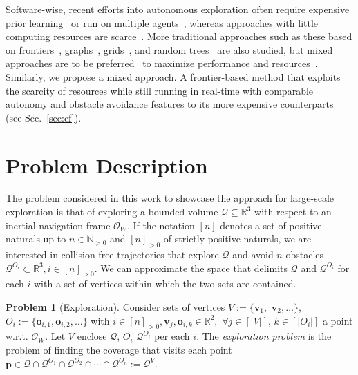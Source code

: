 \documentclass[lettersize,journal]{IEEEtran}
\theoremstyle{definition}
\newtheorem*{pb}{Problem}%
\begin{document}
Software-wise, recent efforts into autonomous exploration often require expensive prior learning~\cite{shrestha2019learned} or run on multiple agents~\cite{kulkarni2022autonomous,tranzatto2022cerberus,roucek2020darpa}, whereas %
approaches with little computing resources are scarce~\cite{bircher2016receding,batinovic2021multi,faisal2021low,muller2021openbot}. More traditional approaches such as these based on frontiers~\cite{kim2022autonomous,roucek2020darpa,batinovic2021multi}, graphs~\cite{kulkarni2022autonomous,tranzatto2022cerberus,dang2019graph}, grids~\cite{corah2019communication,tabib2022autonomous}, and random trees~\cite{papachristos2017uncertainty} are also studied, but mixed approaches are to be preferred~\cite{kohlbrecher2014hector,mei2006energy,shrestha2019learned,bircher2016receding,surmann2003autonomous,wenchuan2019sampling,dai2020fast} to maximize performance and resources~\cite{placed2022survey,bircher2016receding}.
%
Similarly, we propose a mixed approach. A frontier-based method that exploits the scarcity of resources while still running in real-time with comparable autonomy and obstacle avoidance features to its more expensive counterparts~\cite{roucek2020darpa,tranzatto2022cerberus,kim2022autonomous,dang2019graph} (see Sec.~\ref{sec:cf}).



\section{Problem Description}
\label{sec:pf}

The problem considered in this work to showcase the approach for large-scale exploration is that of exploring a bounded volume $\mathcal{Q}\subseteq\mathbb{R}^3$ with respect to an inertial navigation frame $\mathcal{O}_W$. If the notation $[n]$ denotes a set of positive naturals up to $n\in\mathbb{N}_{>0}$ and $[n]_{>0}$ of strictly positive naturals, we are interested in collision-free trajectories that explore $\mathcal{Q}$ and avoid $n$ obstacles $\mathcal{Q}^{O_i}\subset\mathbb{R}^3,i\in[n]_{>0}$. We can approximate the space that delimits $\mathcal{Q}$ and $\mathcal{Q}^{O_i}$ for each $i$ with a set of vertices within which the two sets are contained.

\begin{pb}[Exploration]
  Consider sets of vertices $V:=\{\mathbf{v}_1,$ $\mathbf{v}_2,\dots\}$, $O_i:=\{\mathbf{o}_{i,1},\mathbf{o}_{i,2},\dots\}$ with $i\in[n]_{>0},\mathbf{v}_j,\mathbf{o}_{i,k}\in\mathbb{R}^2,$ $\forall j\in[|V|],\,k\in[|O_i|]$ a point w.r.t. $\mathcal{O}_W$. Let $V$ enclose $\mathcal{Q}$, $O_i$ $\mathcal{Q}^{O_i}$ per each $i$. The \textit{exploration problem} is the problem of finding the coverage that visits each point $\mathbf{p}\in\mathcal{Q}\cap\mathcal{Q}^{O_1}\cap\mathcal{Q}^{O_2}\cap\cdots\cap\mathcal{Q}^{O_n}:=\mathcal{Q}^V$.
\end{pb}
\end{document}

